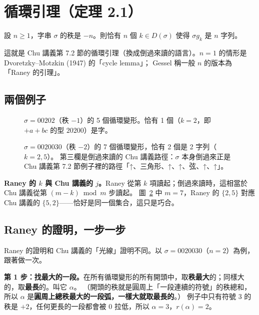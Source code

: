\section{循環引理（定理 2.1）}\label{sec:cycle}

\begin{thmbox}[定理 2.1 \paper{p.~442}]
設 $n\ge1$，字串 $\sigma$ 的秩是 $-n$。則恰有 $n$ 個 $k\in D(\sigma)$ 使得 $\sigma g_k$ 是 $n$ 字列。
\end{thmbox}

這就是 Chu 講義第 7.2 節的循環引理（換成倒過來讀的語言）。$n=1$ 的情形是 Dvoretzky--Motzkin (1947) 的「cycle lemma」；
Gessel 稱一般 $n$ 的版本為「Raney 的引理」。

\subsection{兩個例子}

\begin{figure}[H]
\centering
\RanCycOne
\caption{$\sigma=00202$（秩 $-1$）的 5 個循環變形。恰有 1 個（$k=2$，即 $+a+bc$ 的型 $20200$）是字。}
\label{fig:cyc1}
\end{figure}

\begin{figure}[H]
\centering
\RanCycTwo
\caption{$\sigma=0020030$（秩 $-2$）的 7 個循環變形，恰有 2 個是 2 字列（$k=2,5$）。
第三欄是倒過來讀的 Chu 講義路徑：$\sigma$ 本身倒過來正是 Chu 講義第 7.2 節例子裡的路徑「↑、三角形、↑、↑、弦、↑、↑」。}
\label{fig:cyc2}
\end{figure}

\textbf{Raney 的 $k$ 與 Chu 講義的 $j$。}Raney 從第 $k$ 項讀起；倒過來讀時，這相當於 Chu 講義從第 $(m-k)\bmod m$ 步讀起。
圖~\ref{fig:cyc2} 中 $m=7$，Raney 的 $\{2,5\}$ 對應 Chu 講義的 $\{5,2\}$——恰好是同一個集合，這只是巧合。

\subsection{Raney 的證明，一步一步}

Raney 的證明和 Chu 講義的「光線」證明不同。以 $\sigma=0020030$（$n=2$）為例，跟著做一次。

\textbf{第 1 步：找最大的一段。}在所有循環變形的所有開頭中，取\textbf{秩最大}的；同樣大的，取\textbf{最長}的。叫它 $\alpha$。
（開頭的秩就是圓周上「一段連續的符號」的秩總和，所以 $\alpha$ 是\textbf{圓周上總秩最大的一段弧，一樣大就取最長的}。）
例子中只有符號 3 的秩是 $+2$，任何更長的一段都會被 0 拉低，所以 $\alpha=3$，$r(\alpha)=2$。

